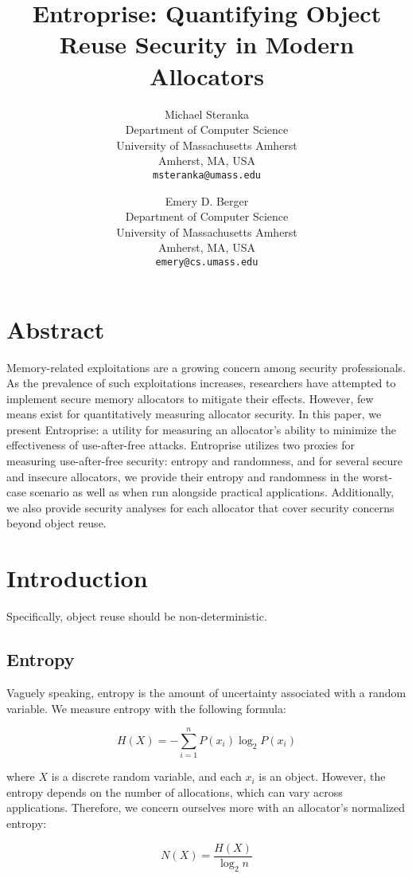 \documentclass[11pt]{article}
\author{
    Michael Steranka\\
    Department of Computer Science\\
    University of Massachusetts Amherst\\
    Amherst, MA, USA\\
    \texttt{msteranka@umass.edu}
    \and
    Emery D. Berger\\
    Department of Computer Science\\
    University of Massachusetts Amherst\\
    Amherst, MA, USA\\
    \texttt{emery@cs.umass.edu}
}
\title{Entroprise: Quantifying Object Reuse Security in Modern Allocators}
\date{}
\begin{document}
\maketitle

\begin{multicols*}{2}

\section*{Abstract}

\noindent Memory-related exploitations are a growing concern among security professionals.
As the prevalence of such exploitations increases, researchers have attempted to implement
secure memory allocators to mitigate their effects.
However, few means exist for quantitatively measuring allocator security.
In this paper, we present Entroprise: a utility for measuring an allocator's ability to minimize the effectiveness of use-after-free attacks.
Entroprise utilizes two proxies for measuring use-after-free security: entropy and randomness, and for several secure and insecure allocators, we provide their entropy and randomness in the worst-case scenario as well as when run alongside practical applications.
Additionally, we also provide security analyses for each allocator that cover security concerns beyond object reuse.

\section{Introduction}

\blindtext

Specifically, object reuse should be non-deterministic.

\subsection{Entropy}

\noindent Vaguely speaking, entropy is the amount of uncertainty associated with a random variable.
We measure entropy with the following formula:

\[ H(X) = -\sum_{i=1}^{n} P(x_i)\log_2P(x_i) \]

\noindent where \( X \) is a discrete random variable, and each \( x_i \) is an object.
However, the entropy depends on the number of allocations, which can vary across applications.
Therefore, we concern ourselves more with an allocator's normalized entropy:

\[ N(X) = \frac{H(X)}{\log_2n} \]


\end{multicols*}
\end{document}
